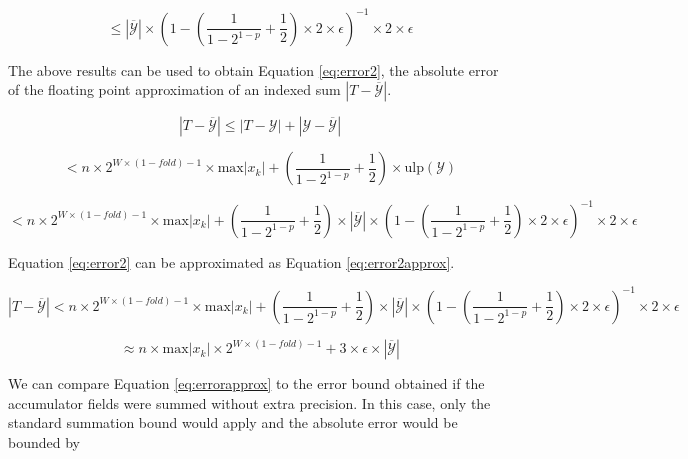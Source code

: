 \documentclass[12pt]{article}
\providecommand{\max}{\ensuremath{\text{max}}}
\providecommand{\ulp}{\ensuremath{\text{ulp}}}
\theoremstyle{plain}
\numberwithin{equation}{section}
\begin{document}
    \begin{equation*}
      \leq |\overline{\mathcal{Y}}|\times (1 - (\frac{1}{1 - 2^{1 - p}} + \frac{1}{2})\times 2 \times \epsilon)^{-1} \times 2 \times \epsilon
    \end{equation*}

    The above results can be used to obtain Equation \ref{eq:error2}, the absolute error of the floating point approximation of an indexed sum $|T - \overline{\mathcal{Y}}|$.

    \begin{equation*}
      |T - \overline{\mathcal{Y}}| \leq |T - \mathcal{Y}| + |\mathcal{Y} - \overline{\mathcal{Y}}|
    \end{equation*}

    \begin{equation*}
      < n \times 2^{W \times (1 - fold) - 1} \times \max|x_k| + (\frac{1}{1 - 2^{1 - p}} + \frac{1}{2})\times \ulp(\mathcal{Y})
    \end{equation*}

    \begin{equation}
      < n \times 2^{W \times (1 - fold) - 1} \times \max|x_k| + (\frac{1}{1 - 2^{1 - p}} + \frac{1}{2})\times|\overline{\mathcal{Y}}|\times (1 - (\frac{1}{1 - 2^{1 - p}} + \frac{1}{2})\times 2 \times \epsilon)^{-1} \times 2 \times \epsilon
      \label{eq:error2}
    \end{equation}

    Equation \ref{eq:error2} can be approximated as Equation \ref{eq:error2approx}.

    \begin{equation*}
      |T - \overline{\mathcal{Y}}| < n \times 2^{W \times (1 - fold) - 1} \times \max|x_k| + (\frac{1}{1 - 2^{1 - p}} + \frac{1}{2})\times|\overline{\mathcal{Y}}|\times (1 - (\frac{1}{1 - 2^{1 - p}} + \frac{1}{2})\times 2 \times \epsilon)^{-1} \times 2 \times \epsilon
    \end{equation*}

    \begin{equation}
      \approx n \times \max|x_k|\times 2^{W \times (1 - fold) - 1} + 3 \times \epsilon \times |\overline{\mathcal{Y}}|
      \label{eq:error2approx}
    \end{equation}

    We can compare Equation \ref{eq:errorapprox} to the error bound obtained if the accumulator fields were summed without extra precision. In this case, only the standard summation bound would apply and the absolute error would be bounded by
\end{document}
